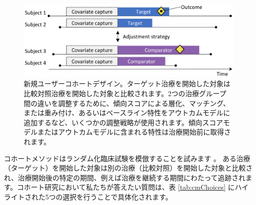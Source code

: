 \documentclass[
  11pt]{book}
\theoremstyle{definition}
\theoremstyle{definition}
\theoremstyle{definition}
\theoremstyle{definition}
\theoremstyle{remark}
\begin{document}

\begin{figure}

{\centering \includegraphics[width=0.9\linewidth]{images/PopulationLevelEstimation/cohortMethod} 

}

\caption{新規ユーザーコホートデザイン。ターゲット治療を開始した対象は比較対照治療を開始した対象と比較されます。2つの治療グループ間の違いを調整するために、傾向スコアによる層化、マッチング、または重み付け、あるいはベースライン特性をアウトカムモデルに追加するなど、いくつかの調整戦略が使用されます。傾向スコアモデルまたはアウトカムモデルに含まれる特性は治療開始前に取得されます。}\label{fig:cohortMethod}
\end{figure}

コホートメソッドはランダム化臨床試験を模倣することを試みます \citep{hernan_2016}。 ある治療（ターゲット）を開始した対象は別の治療（比較対照）を開始した対象と比較され、治療開始後の特定の期間、例えば治療を継続する期間にわたって追跡されます。コホート研究において私たちが答えたい質問は、表 \ref{tab:cmChoices} にハイライトされた5つの選択を行うことで具体化されます。   
\end{document}
